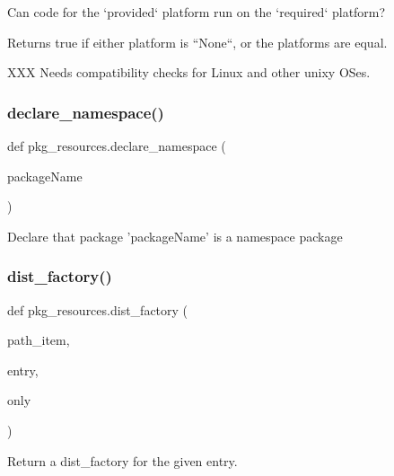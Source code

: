 \begin{DoxyVerb}Can code for the `provided` platform run on the `required` platform?

Returns true if either platform is ``None``, or the platforms are equal.

XXX Needs compatibility checks for Linux and other unixy OSes.
\end{DoxyVerb}
 \mbox{\label{namespacepkg__resources_a56e0436c68d4a6a6d3674c418b628593}} 
\subsubsection{\texorpdfstring{declare\+\_\+namespace()}{declare\_namespace()}}
{\footnotesize\ttfamily def pkg\+\_\+resources.\+declare\+\_\+namespace (\begin{DoxyParamCaption}\item[{}]{package\+Name }\end{DoxyParamCaption})}

\begin{DoxyVerb}Declare that package 'packageName' is a namespace package\end{DoxyVerb}
 \mbox{\label{namespacepkg__resources_a2dd2cfe9de57b827c6747e80e1ef18e2}} 
\subsubsection{\texorpdfstring{dist\+\_\+factory()}{dist\_factory()}}
{\footnotesize\ttfamily def pkg\+\_\+resources.\+dist\+\_\+factory (\begin{DoxyParamCaption}\item[{}]{path\+\_\+item,  }\item[{}]{entry,  }\item[{}]{only }\end{DoxyParamCaption})}

\begin{DoxyVerb}Return a dist_factory for the given entry.\end{DoxyVerb}
 \mbox{\label{namespacepkg__resources_abbb0c07a5cceabd55690cf052dfbea0d}} 
